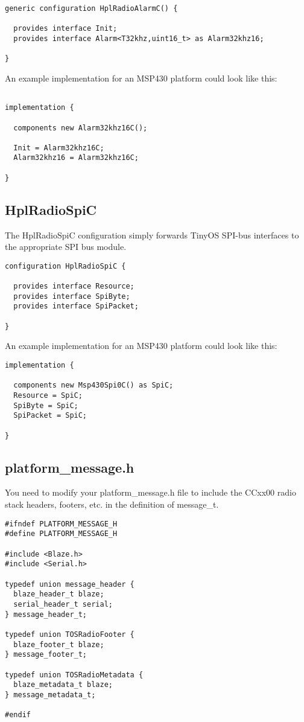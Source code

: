 \documentclass{article}
\begin{document}
\begin{verbatim}
generic configuration HplRadioAlarmC() {

  provides interface Init;
  provides interface Alarm<T32khz,uint16_t> as Alarm32khz16;

}
\end{verbatim}

An example implementation for an MSP430 platform could look like this:

\begin{verbatim}

implementation {

  components new Alarm32khz16C();

  Init = Alarm32khz16C;
  Alarm32khz16 = Alarm32khz16C;
  
}
\end{verbatim}



\subsection{HplRadioSpiC}
The HplRadioSpiC configuration simply forwards TinyOS SPI-bus interfaces to the 
appropriate SPI bus module.

\begin{verbatim}
configuration HplRadioSpiC {
  
  provides interface Resource;
  provides interface SpiByte;
  provides interface SpiPacket;
  
}
\end{verbatim}

An example implementation for an MSP430 platform could look like this:

\begin{verbatim}
implementation {

  components new Msp430Spi0C() as SpiC;
  Resource = SpiC;
  SpiByte = SpiC;
  SpiPacket = SpiC;

}
\end{verbatim}


\subsection{platform\_message.h}

You need to modify your platform\_message.h file to include the CCxx00 radio stack headers,
footers, etc. in the definition of message\_t.

\begin{verbatim}
#ifndef PLATFORM_MESSAGE_H
#define PLATFORM_MESSAGE_H

#include <Blaze.h>
#include <Serial.h>

typedef union message_header {
  blaze_header_t blaze;
  serial_header_t serial;
} message_header_t;

typedef union TOSRadioFooter {
  blaze_footer_t blaze;
} message_footer_t;

typedef union TOSRadioMetadata {
  blaze_metadata_t blaze;
} message_metadata_t;

#endif
\end{verbatim}
\end{document}
